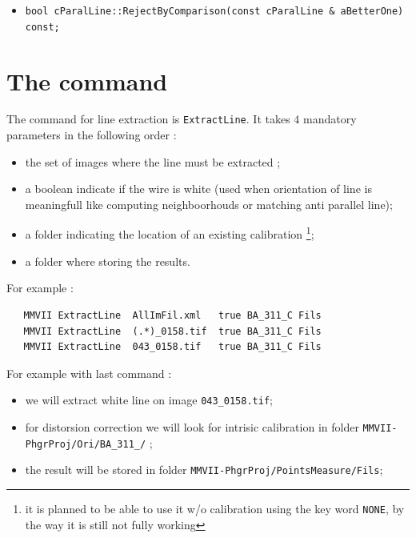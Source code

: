 \begin{itemize}
   \item  {\tt bool cParalLine::RejectByComparison(const cParalLine \& aBetterOne) const;}
\end{itemize}



\section{The \PPP command }

The command for line extraction is {\tt ExtractLine}. It takes $4$  mandatory parameters  in the following order :


\begin{itemize}
   \item  the set of images where the line must be extracted ;
   \item  a boolean indicate if the wire is white  (used when orientation of line is meaningfull like computing neighboorhouds
          or matching anti parallel line);
   \item  a folder indicating the location of an existing calibration  \footnote{it is planned to be able to use
          it w/o calibration using the key word {\tt NONE}, by the way it is still not fully working};
   \item  a folder where storing the results.
\end{itemize}

For example :

\begin{verbatim}
   MMVII ExtractLine  AllImFil.xml   true BA_311_C Fils 
   MMVII ExtractLine  (.*)_0158.tif  true BA_311_C Fils 
   MMVII ExtractLine  043_0158.tif   true BA_311_C Fils 
\end{verbatim}

For example with last command :

\begin{itemize}
    \item we will extract white line on image {\tt 043\_0158.tif};

    \item for distorsion correction we will look for intrisic calibration in 
          folder {\tt MMVII-PhgrProj/Ori/BA\_311\_/} ;

    \item the result will be stored in folder {\tt MMVII-PhgrProj/PointsMeasure/Fils};
\end{itemize}

